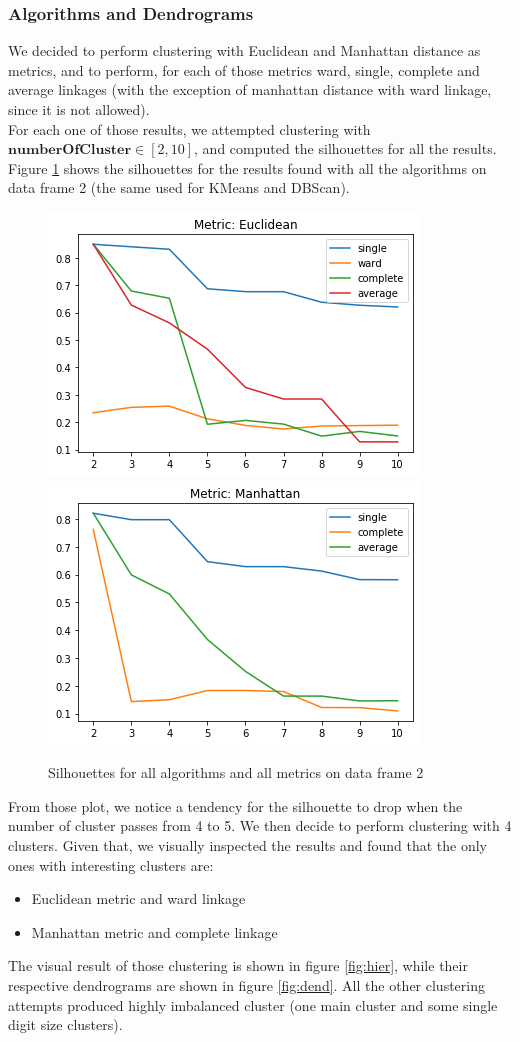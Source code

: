 \documentclass{article}
\begin{document}
	\subsubsection{Algorithms and Dendrograms}
	\label{sec:hier}
	We decided to perform clustering with Euclidean and Manhattan distance as metrics, and to perform, for each of those metrics ward, single, complete and average linkages (with the exception of manhattan distance with ward linkage, since it is not allowed).\\
	For each one of those results, we attempted clustering with $\mathbf{numberOfCluster} \in [2, 10]$, and computed the silhouettes for all the results.
	Figure \ref{fig:silu} shows the silhouettes for the results found with all the algorithms on data frame 2 (the same used for KMeans and DBScan).
	\begin{figure}[H]
		\centering
		\includegraphics[width=.35\textwidth]{silueuc}\hspace{1cm}
		\includegraphics[width=.35\textwidth]{siluman.png}
		\caption{Silhouettes for all algorithms and all metrics on data frame 2}
		\label{fig:silu}
	\end{figure}
	From those plot, we notice a tendency for the silhouette to drop when the number of cluster passes from 4 to 5. We then decide to perform clustering with 4 clusters.
	Given that, we visually inspected the results and found that the only ones with interesting clusters are:
	\begin{itemize}
		\item Euclidean metric and ward linkage
		\item Manhattan metric and complete linkage
	\end{itemize}
	The visual result of those clustering is shown in figure \ref{fig:hier}, while their respective dendrograms are shown in figure \ref{fig:dend}. All the other clustering attempts produced highly imbalanced cluster (one main cluster and some single digit size clusters).
\end{document}
